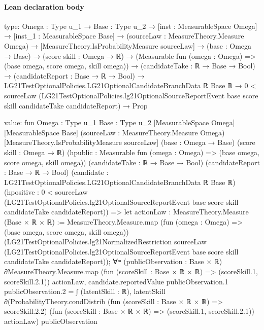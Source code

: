 \documentclass[10pt]{article}
\begin{document}
\paragraph{Lean declaration body}
\begin{ReviewVerbatim}
type:
{Omega : Type u_1} →
  {Base : Type u_2} →
    [inst : MeasurableSpace Omega] →
      [inst_1 : MeasurableSpace Base] →
        (sourceLaw : MeasureTheory.Measure Omega) →
          [MeasureTheory.IsProbabilityMeasure sourceLaw] →
            (base : Omega → Base) →
              (score skill : Omega → ℝ) →
                (Measurable fun (omega : Omega) => (base omega, score omega, skill omega)) →
                  (candidateTake : ℝ → Base → Bool) →
                    (candidateReport : Base → ℝ → Bool) →
                      LG21TestOptionalPolicies.LG21OptionalCandidateBranchData ℝ Base ℝ →
                        0 <
                            sourceLaw
                              (LG21TestOptionalPolicies.lg21OptionalSourceReportEvent base score skill candidateTake
                                candidateReport) →
                          Prop

value:
fun {Omega : Type u_1} {Base : Type u_2} [MeasurableSpace Omega] [MeasurableSpace Base]
    (sourceLaw : MeasureTheory.Measure Omega) [MeasureTheory.IsProbabilityMeasure sourceLaw] (base : Omega → Base)
    (score skill : Omega → ℝ) (hpublic : Measurable fun (omega : Omega) => (base omega, score omega, skill omega))
    (candidateTake : ℝ → Base → Bool) (candidateReport : Base → ℝ → Bool)
    (candidate : LG21TestOptionalPolicies.LG21OptionalCandidateBranchData ℝ Base ℝ)
    (hpositive :
      0 <
        sourceLaw
          (LG21TestOptionalPolicies.lg21OptionalSourceReportEvent base score skill candidateTake candidateReport)) =>
  let actionLaw : MeasureTheory.Measure (Base × ℝ × ℝ) :=
    MeasureTheory.Measure.map (fun (omega : Omega) => (base omega, score omega, skill omega))
      (LG21TestOptionalPolicies.lg21NormalizedRestriction sourceLaw
        (LG21TestOptionalPolicies.lg21OptionalSourceReportEvent base score skill candidateTake candidateReport));
  ∀ᵐ (publicObservation :
    Base × ℝ) ∂MeasureTheory.Measure.map (fun (scoreSkill : Base × ℝ × ℝ) => (scoreSkill.1, scoreSkill.2.1)) actionLaw,
    candidate.reportedValue publicObservation.1 publicObservation.2 =
      ∫ (latentSkill : ℝ),
        latentSkill ∂(ProbabilityTheory.condDistrib (fun (scoreSkill : Base × ℝ × ℝ) => scoreSkill.2.2)
            (fun (scoreSkill : Base × ℝ × ℝ) => (scoreSkill.1, scoreSkill.2.1)) actionLaw)
          publicObservation
\end{ReviewVerbatim}
\end{document}
